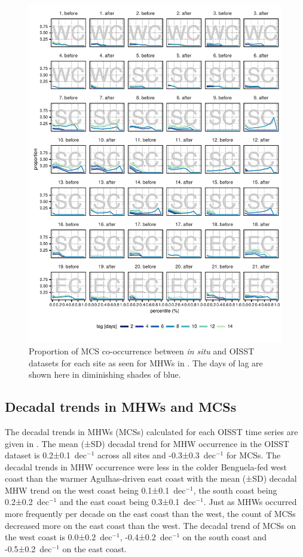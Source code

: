 \documentclass[a4paper,10pt,review]{elsarticle}
\begin{document}
\begin{figure}
\includegraphics[width=1.0\textwidth]{figure5.pdf}
\caption{Proportion of MCS co-occurrence between \emph{in situ} and OISST datasets for each site as seen for MHWs in . The days of lag are shown here in diminishing shades of blue.}
\label{fig:Figure5}
\end{figure}

\subsection{Decadal trends in MHWs and MCSs}
The decadal trends in MHWs (MCSs) calculated for each OISST time series are given in . The mean (±SD) decadal trend for MHW occurrence in the OISST dataset is 0.2±0.1~dec$^{-1}$ across all sites and -0.3±0.3~dec$^{-1}$ for MCSs. The decadal trends in MHW occurrence were less in the colder Benguela-fed west coast than the warmer Agulhas-driven east coast with the mean (±SD) decadal MHW trend on the west coast being 0.1±0.1~dec$^{-1}$, the south coast being 0.2±0.2~dec$^{-1}$ and the east coast being 0.3±0.1~dec$^{-1}$. Just as MHWs occurred more frequently per decade on the east coast than the west, the count of MCSs decreased more on the east coast than the west. The decadal trend of MCSs on the west coast is 0.0±0.2~dec$^{-1}$, -0.4±0.2~dec$^{-1}$ on the south coast and -0.5±0.2~dec$^{-1}$ on the east coast.
\end{document}
